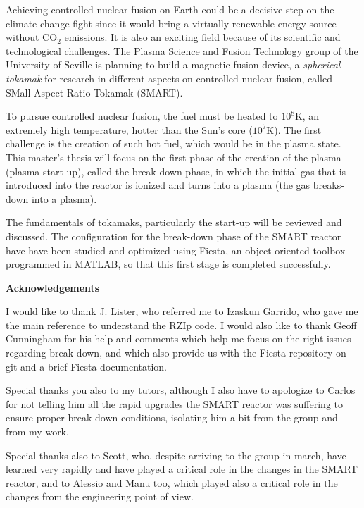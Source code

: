 \documentclass[a4paper,12pt,oneside]{book}
\begin{document}
Achieving controlled nuclear fusion on Earth could be a decisive step on the climate change fight since it would bring a virtually renewable energy source without CO$_2$ emissions. It is also an exciting field because of its scientific and technological challenges. The Plasma Science and Fusion Technology group of the University of Seville is planning to build a magnetic fusion device, a \textit{spherical tokamak} for research in different aspects on controlled nuclear fusion, called SMall Aspect Ratio Tokamak (SMART).

To pursue controlled nuclear fusion, the fuel must be heated to $10^8$K, an extremely high temperature, hotter than the Sun's core ($10^7$K). The first challenge is the creation of such hot fuel, which would be in the plasma state. This master's thesis will focus on the first phase of the creation of the plasma (plasma start-up), called the break-down phase, in which the initial gas that is introduced into the reactor is ionized and turns into a plasma (the gas breaks-down into a plasma).

The fundamentals of tokamaks, particularly the start-up will be reviewed and discussed. The configuration for the break-down phase of the SMART reactor have have been studied and optimized using Fiesta, an object-oriented toolbox programmed in MATLAB, so that this first stage is completed successfully.


\newpage

\begin{center}
\begin{large}
\textbf{Acknowledgements}
\end{large}

\end{center}

I would like to thank J. Lister, who referred me to Izaskun Garrido, who gave me the main reference to understand the RZIp code.  I would also like to thank Geoff Cunningham for his help and comments which help me focus on the right issues regarding break-down, and which also provide us with the Fiesta repository on git and a brief Fiesta documentation.

Special thanks you also to my tutors, although I also have to apologize to Carlos for not telling him all the rapid upgrades the SMART reactor was suffering to ensure proper break-down conditions, isolating him a bit from the group and from my work.

Special thanks also to Scott, who, despite arriving to the group in march,  have learned very rapidly and have played a critical role in the changes in the SMART reactor, and to Alessio and Manu too, which played also a critical role in the changes from the engineering point of view. 
\end{document}
